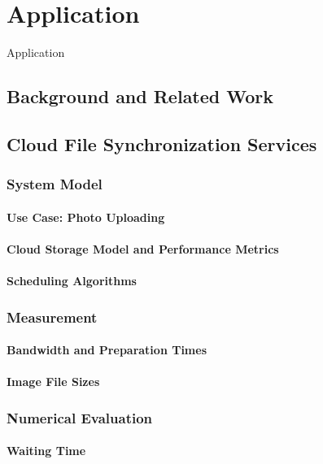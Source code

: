 \chapter{Application}\label{chap:application}
Application

\cite{Schwartz2013b}
\section{Background and Related Work}

\section{Cloud File Synchronization Services}
\cite{Schwartz2014a}

\subsection{System Model}
\subsubsection*{Use Case: Photo Uploading}
\subsubsection*{Cloud Storage Model and Performance Metrics}
\subsubsection*{Scheduling Algorithms}

\subsection{Measurement}
\subsubsection*{Bandwidth and Preparation Times}
\subsubsection*{Image File Sizes}

\subsection{Numerical Evaluation}
\subsubsection*{Waiting Time}
